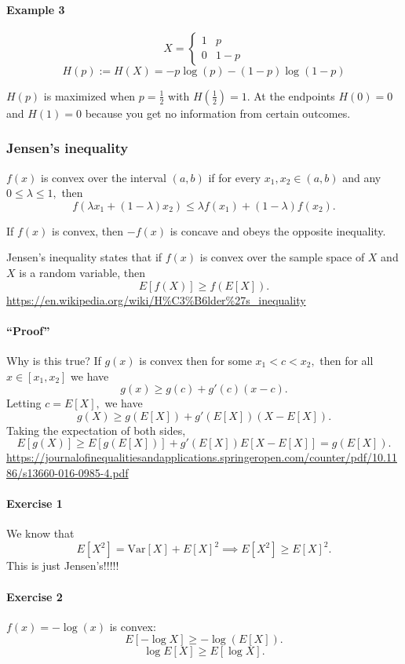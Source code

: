 \documentclass[12pt]{article}
\begin{document}
\paragraph{Example 3}
\[
X = \begin{cases}
    1 & p \\ 0 & 1 - p
\end{cases}
\]
\[
H(p):=H(X) = -p \log(p) - (1-p)\log(1-p)
\]

$H(p)$ is maximized when $p=\frac{1}{2}$ with $H\left(\frac{1}{2}\right)=1$. At the endpoints $H(0) = 0$ and $H(1) = 0$ because you get no information from certain outcomes.

\subsubsection{Jensen's inequality}
$f(x)$ is convex over the interval $(a, b)$ if for every $x_1, x_2 \in (a,b)$ and any $0\le\lambda\le 1,$ then
\[f(\lambda x_1+(1-\lambda)x_2)\le \lambda f(x_1)+(1-\lambda)f(x_2).\]

If $f(x)$ is convex, then $-f(x)$ is concave and obeys the opposite inequality.

Jensen's inequality states that if $f(x)$ is convex over the sample space of $X$ and $X$ is a random variable, then
\[E[f(X)]\ge f(E[X]).\]
\url{https://en.wikipedia.org/wiki/H%C3%B6lder%27s_inequality}

\paragraph{``Proof''} Why is this true?
If $g(x)$ is convex then for some $x_1<c<x_2,$ then for all $x \in [x_1, x_2]$ we have
\[g(x)\ge g(c)+g'(c)(x-c).\] Letting $c=E[X],$
 we have
 \[g(X)\ge g(E[X])+g'(E[X])(X-E[X]).\]
 Taking the expectation of both sides,
 \[E[g(X)] \ge E[g(E[X])]+g'(E[X])E[X-E[X]]=g(E[X]).\]
 \url{https://journalofinequalitiesandapplications.springeropen.com/counter/pdf/10.1186/s13660-016-0985-4.pdf}
\paragraph{Exercise 1}
We know that
\[E[X^2]=\mathrm{Var}[X]+E[X]^2 \implies E[X^2] \ge E[X]^2.\] This is just Jensen's!!!!!

\paragraph{Exercise 2}
$f(x)=-\log(x)$ is convex:
\[E[-\log X]\ge -\log(E[X]).\]
\[\log E[X]\ge E[\log X].\]
\end{document}
